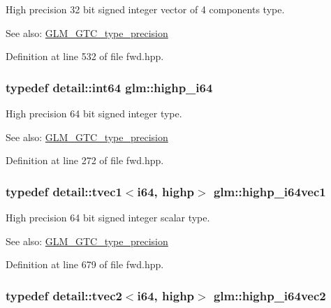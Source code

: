 High precision 32 bit signed integer vector of 4 components type. \begin{Desc}
\item[See also:]\hyperlink{group__gtc__type__precision}{GLM\_\-GTC\_\-type\_\-precision} \end{Desc}


Definition at line 532 of file fwd.hpp.\hypertarget{group__gtc__type__precision_gd3cb9a0ac0266ea2c51c6fac256345d1}{
\subsubsection[highp\_\-i64]{\setlength{\rightskip}{0pt plus 5cm}typedef detail::int64 {\bf glm::highp\_\-i64}}}
\label{group__gtc__type__precision_gd3cb9a0ac0266ea2c51c6fac256345d1}


High precision 64 bit signed integer type. \begin{Desc}
\item[See also:]\hyperlink{group__gtc__type__precision}{GLM\_\-GTC\_\-type\_\-precision} \end{Desc}


Definition at line 272 of file fwd.hpp.\hypertarget{group__gtc__type__precision_g06c21aba992669f5c160ec5f5a480522}{
\subsubsection[highp\_\-i64vec1]{\setlength{\rightskip}{0pt plus 5cm}typedef detail::tvec1$<$i64, highp$>$ {\bf glm::highp\_\-i64vec1}}}
\label{group__gtc__type__precision_g06c21aba992669f5c160ec5f5a480522}


High precision 64 bit signed integer scalar type. \begin{Desc}
\item[See also:]\hyperlink{group__gtc__type__precision}{GLM\_\-GTC\_\-type\_\-precision} \end{Desc}


Definition at line 679 of file fwd.hpp.\hypertarget{group__gtc__type__precision_gbfe3aa6fa4003a47577beb9678ab2661}{
\subsubsection[highp\_\-i64vec2]{\setlength{\rightskip}{0pt plus 5cm}typedef detail::tvec2$<$i64, highp$>$ {\bf glm::highp\_\-i64vec2}}}
\label{group__gtc__type__precision_gbfe3aa6fa4003a47577beb9678ab2661}



